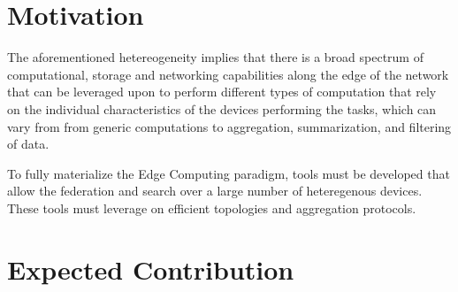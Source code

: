 \section{Motivation}

The aforementioned hetereogeneity implies that there is a broad spectrum of
computational, storage and networking capabilities along the edge of the network that
can be leveraged upon to perform different types of computation that rely on the individual
characteristics of the devices performing the tasks, which can vary from
from generic computations to aggregation, summarization, and filtering of data. \cite{DBLP:journals/corr/abs-1805-06989}


To fully materialize the Edge Computing paradigm, tools must be developed that allow the
federation and search over a large number of heteregenous devices. These tools must leverage on efficient
topologies and aggregation protocols.

\section{Expected Contribution}




